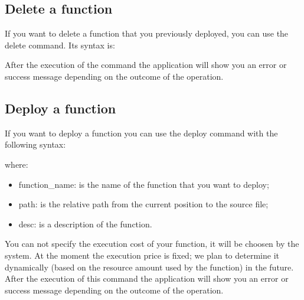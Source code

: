 \subsection{Delete a function}
If you want to delete a function that you previously deployed, you can use the delete command. Its syntax is:
\begin{center}
\end{center}
After the execution of the command  the application will show you an error or success message depending on the outcome of the operation.

\subsection{Deploy a function}
If you want to deploy a function you can use the deploy command with the following syntax:
\begin{center}
\end{center}
\noindent where:
\begin{itemize}
	\item function\_name: is the name of the function that you want to deploy;
	\item path: is the relative path from the current position to the source file;
	\item desc: is a description of the function.
\end{itemize}
You can not specify the execution cost of your function, it will be choosen by the system. At the moment the execution price is fixed; we plan to determine it dynamically (based on the resource amount used by the function) in the future. After the execution of this command  the application will show you an error or success message depending on the outcome of the operation.
